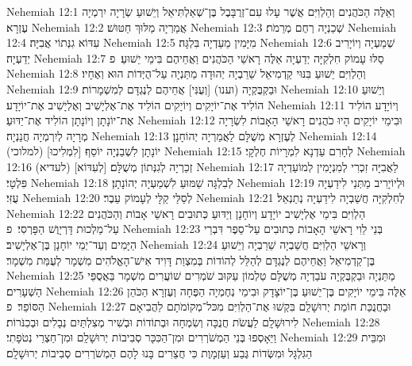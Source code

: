Nehemiah 12:1	וְאֵלֶּה הַכֹּהֲנִים וְהַלְוִיִּם אֲשֶׁר עָלוּ עִם־זְרֻבָּבֶל בֶּן־שְׁאַלְתִּיאֵל וְיֵשׁוּעַ שְׂרָיָה יִרְמְיָה עֶזְרָא׃
Nehemiah 12:2	אֲמַרְיָה מַלּוּךְ חַטּוּשׁ׃
Nehemiah 12:3	שְׁכַנְיָה רְחֻם מְרֵמֹת׃
Nehemiah 12:4	עִדּוֹא גִנְּתוֹי אֲבִיָּה׃
Nehemiah 12:5	מִיָּמִין מַעַדְיָה בִּלְגָּה׃
Nehemiah 12:6	שְׁמַעְיָה וְיוֹיָרִיב יְדַעְיָה׃
Nehemiah 12:7	סַלּוּ עָמוֹק חִלְקִיָּה יְדַעְיָה אֵלֶּה רָאשֵׁי הַכֹּהֲנִים וַאֲחֵיהֶם בִּימֵי יֵשׁוּעַ׃ {פ}
Nehemiah 12:8	וְהַלְוִיִּם יֵשׁוּעַ בִּנּוּי קַדְמִיאֵל שֵׁרֵבְיָה יְהוּדָה מַתַּנְיָה עַל־הֻיְּדוֹת הוּא וְאֶחָיו׃
Nehemiah 12:9	וּבַקְבֻּקְיָה (וענו) [וְעֻנִּי] אֲחֵיהֶם לְנֶגְדָּם לְמִשְׁמָרוֹת׃
Nehemiah 12:10	וְיֵשׁוּעַ הוֹלִיד אֶת־יוֹיָקִים וְיוֹיָקִים הוֹלִיד אֶת־אֶלְיָשִׁיב וְאֶלְיָשִׁיב אֶת־יוֹיָדָע׃
Nehemiah 12:11	וְיוֹיָדָע הוֹלִיד אֶת־יוֹנָתָן וְיוֹנָתָן הוֹלִיד אֶת־יַדּוּעַ׃
Nehemiah 12:12	וּבִימֵי יוֹיָקִים הָיוּ כֹהֲנִים רָאשֵׁי הָאָבוֹת לִשְׂרָיָה מְרָיָה לְיִרְמְיָה חֲנַנְיָה׃
Nehemiah 12:13	לְעֶזְרָא מְשֻׁלָּם לַאֲמַרְיָה יְהוֹחָנָן׃
Nehemiah 12:14	(למלוכי) [לִמְלִיכוּ] יוֹנָתָן לִשְׁבַנְיָה יוֹסֵף׃
Nehemiah 12:15	לְחָרִם עַדְנָא לִמְרָיוֹת חֶלְקָי׃
Nehemiah 12:16	(לעדיא) [לְעִדּוֹא] זְכַרְיָה לְגִנְּתוֹן מְשֻׁלָּם׃
Nehemiah 12:17	לַאֲבִיָּה זִכְרִי לְמִנְיָמִין לְמוֹעַדְיָה פִּלְטָי׃
Nehemiah 12:18	לְבִלְגָּה שַׁמּוּעַ לִשְׁמַעְיָה יְהוֹנָתָן׃
Nehemiah 12:19	וּלְיוֹיָרִיב מַתְּנַי לִידַעְיָה עֻזִּי׃
Nehemiah 12:20	לְסַלַּי קַלָּי לְעָמוֹק עֵבֶר׃
Nehemiah 12:21	לְחִלְקִיָּה חֲשַׁבְיָה לִידַעְיָה נְתַנְאֵל׃
Nehemiah 12:22	הַלְוִיִּם בִּימֵי אֶלְיָשִׁיב יוֹיָדָע וְיוֹחָנָן וְיַדּוּעַ כְּתוּבִים רָאשֵׁי אָבוֹת וְהַכֹּהֲנִים עַל־מַלְכוּת דָּרְיָוֶשׁ הַפָּרְסִי׃ {פ}
Nehemiah 12:23	בְּנֵי לֵוִי רָאשֵׁי הָאָבוֹת כְּתוּבִים עַל־סֵפֶר דִּבְרֵי הַיָּמִים וְעַד־יְמֵי יוֹחָנָן בֶּן־אֶלְיָשִׁיב׃
Nehemiah 12:24	וְרָאשֵׁי הַלְוִיִּם חֲשַׁבְיָה שֵׁרֵבְיָה וְיֵשׁוּעַ בֶּן־קַדְמִיאֵל וַאֲחֵיהֶם לְנֶגְדָּם לְהַלֵּל לְהוֹדוֹת בְּמִצְוַת דָּוִיד אִישׁ־הָאֱלֹהִים מִשְׁמָר לְעֻמַּת מִשְׁמָר׃
Nehemiah 12:25	מַתַּנְיָה וּבַקְבֻּקְיָה עֹבַדְיָה מְשֻׁלָּם טַלְמוֹן עַקּוּב שֹׁמְרִים שׁוֹעֲרִים מִשְׁמָר בַּאֲסֻפֵּי הַשְּׁעָרִים׃
Nehemiah 12:26	אֵלֶּה בִּימֵי יוֹיָקִים בֶּן־יֵשׁוּעַ בֶּן־יוֹצָדָק וּבִימֵי נְחֶמְיָה הַפֶּחָה וְעֶזְרָא הַכֹּהֵן הַסּוֹפֵר׃ {פ}
Nehemiah 12:27	וּבַחֲנֻכַּת חוֹמַת יְרוּשָׁלַ͏ִם בִּקְשׁוּ אֶת־הַלְוִיִּם מִכּל־מְקוֹמֹתָם לַהֲבִיאָם לִירוּשָׁלָ͏ִם לַעֲשֹׂת חֲנֻכָּה וְשִׂמְחָה וּבְתוֹדוֹת וּבְשִׁיר מְצִלְתַּיִם נְבָלִים וּבְכִנֹּרוֹת׃
Nehemiah 12:28	וַיֵּאָסְפוּ בְּנֵי הַמְשֹׁרְרִים וּמִן־הַכִּכָּר סְבִיבוֹת יְרוּשָׁלַ͏ִם וּמִן־חַצְרֵי נְטֹפָתִי׃
Nehemiah 12:29	וּמִבֵּית הַגִּלְגָּל וּמִשְּׂדוֹת גֶּבַע וְעַזְמָוֶת כִּי חֲצֵרִים בָּנוּ לָהֶם הַמְשֹׁרְרִים סְבִיבוֹת יְרוּשָׁלָ͏ִם׃
